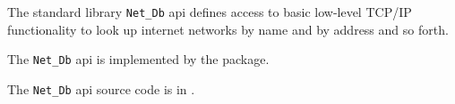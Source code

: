 
The standard library {\tt Net\_Db} api defines access to basic low-level {\sc TCP/IP} 
functionality to look up internet networks by name and by address and so forth.

The {\tt Net\_Db} api is implemented by the  package.

The {\tt Net\_Db} api source code is in .

